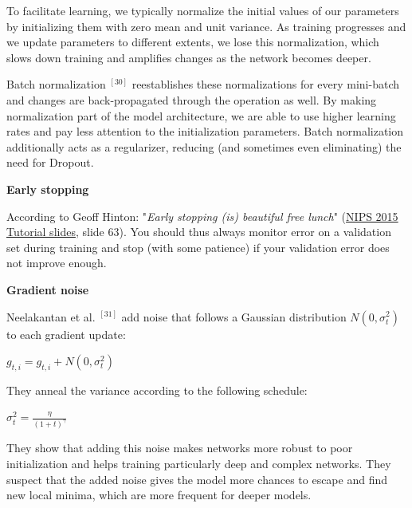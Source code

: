 \documentclass[4pt,journal,compsoc]{IEEEtran}
\begin{document}
\begin{flushleft}
    To facilitate learning, we typically normalize the initial values of our parameters by initializing them with zero mean and unit variance. As training progresses and we update parameters to different extents, we lose this normalization, which slows down training and amplifies changes as the network becomes deeper. \newline
    
    Batch normalization $^ [30]$ reestablishes these normalizations for every mini-batch and changes are back-propagated through the operation as well. By making normalization part of the model architecture, we are able to use higher learning rates and pay less attention to the initialization parameters. Batch normalization additionally acts as a regularizer, reducing (and sometimes even eliminating) the need for Dropout. \newline \newline
    
    \textbf{\Large Early stopping} \newline
    
    According to Geoff Hinton: "\textit{Early stopping (is) beautiful free lunch}" (\underline{NIPS 2015 Tutorial slides}, slide 63). You should thus always monitor error on a validation set during training and stop (with some patience) if your validation error does not improve enough. \newline \newline
    
    \textbf{\Large Gradient noise} \newline
    
    Neelakantan et al. $^ {[31]}$ add noise that follows a Gaussian distribution $N(0, \sigma^2_t)$ to each gradient update: \newline
    
    $g_{t, i} = g_{t, i} + N(0, \sigma^2_t)$ \newline

    They anneal the variance according to the following schedule: \newline
    
    $\sigma^2_t = \frac{\eta}{(1 + t)^\gamma}$ \newline

    They show that adding this noise makes networks more robust to poor initialization and helps training particularly deep and complex networks. They suspect that the added noise gives the model more chances to escape and find new local minima, which are more frequent for deeper models. \newline \newline
    

\end{flushleft}
\end{document}
